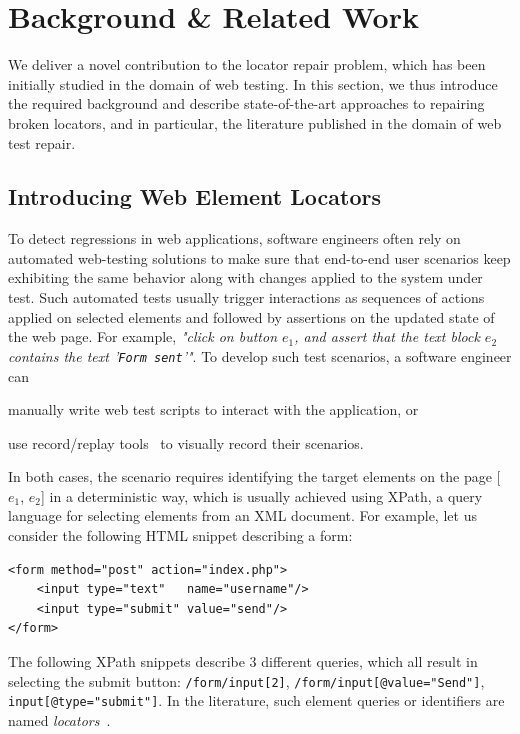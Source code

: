 \section{Background \& Related Work}\label{erratum:sec:related-work}
We deliver a novel contribution to the locator repair problem, which has been initially studied in the domain of web testing.
In this section, we thus introduce the required background and describe state-of-the-art approaches to repairing broken locators, and in particular, the literature published in the domain of web test repair.

\subsection{Introducing Web Element Locators}
To detect regressions in web applications, software engineers often rely on automated web-testing solutions to make sure that end-to-end user scenarios keep exhibiting the same behavior along with changes applied to the system under test.
% 
Such automated tests usually trigger interactions as sequences of actions applied on selected elements and followed by assertions on the updated state of the web page.
For example, \emph{"click on button $e_1$, and assert that the text block $e_2$ contains the text '{\tt Form sent}'"}.
To develop such test scenarios, a software engineer can
\begin{inparaenum}
    \item manually write web test scripts to interact with the application, or
    \item use record/replay tools~\cite{burg2013interactive,sen2013jalangi,mickens2010mugshot} to visually record their scenarios.
\end{inparaenum}
In both cases, the scenario requires identifying the target elements on the page [$e_1$, $e_2$] in a deterministic way, which is usually achieved using XPath, a query language for selecting elements from an XML document.
% 
For example, let us consider the following HTML snippet describing a form:

\begin{lstlisting}
<form method="post" action="index.php"> 
    <input type="text"   name="username"/> 
    <input type="submit" value="send"/>
</form> 
\end{lstlisting}

The following XPath snippets describe 3 different queries, which all result in selecting the submit button: \lstinline!/form/input[2]!, \lstinline!/form/input[@value="Send"]!, \lstinline!input[@type="submit"]!.
In the literature, such element queries or identifiers are named \emph{locators}~\cite{leotta2014reducing}.

